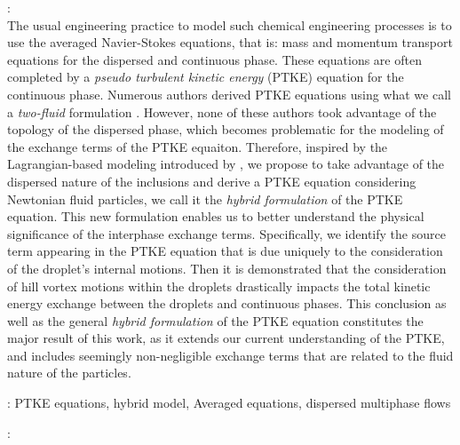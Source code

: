 \documentclass[12pt,a4paper]{article}
\newcommand{\avg}[1]{\left<#1\right>}
\renewcommand{\avg}[1]{\left<#1\right>}
\begin{document}
\vspace{10pt}
:\\
    The usual engineering practice to model such chemical engineering processes is to use the averaged Navier-Stokes equations, that is: mass and momentum transport equations for the dispersed and continuous phase. 
    These equations are often completed by a \textit{pseudo turbulent kinetic energy} (PTKE) equation for the continuous phase. 
    Numerous authors derived PTKE equations using what we call a \textit{two-fluid} formulation \citep{kataoka1986local}. 
    However, none of these authors took advantage of the topology of the dispersed phase, which becomes problematic for the modeling of the exchange terms of the PTKE equaiton. 
    Therefore, inspired by the Lagrangian-based modeling introduced by \citep{buyevich1979flow, lhuillier1992volume}, we propose to take advantage of the dispersed nature of the inclusions and derive a PTKE equation considering Newtonian fluid particles, we call it the \textit{hybrid formulation} of the PTKE equation. 
    This new formulation enables us to better understand the physical significance of the interphase exchange terms. 
    Specifically, we identify the source term appearing in the PTKE equation that is due uniquely to the consideration of the droplet's internal motions.
    Then it is demonstrated that the consideration of hill vortex motions within the droplets drastically impacts the total kinetic energy exchange between the droplets and continuous phases.
    This conclusion as well as the general \textit{hybrid formulation} of the PTKE equation constitutes the major result of this work, as it extends our current understanding of the PTKE, and includes seemingly non-negligible exchange terms that are related to the fluid nature of the particles.
    \vspace{10pt}

: PTKE equations, hybrid model, Averaged equations, dispersed multiphase flows

\vspace{10pt}
:
\end{document}
